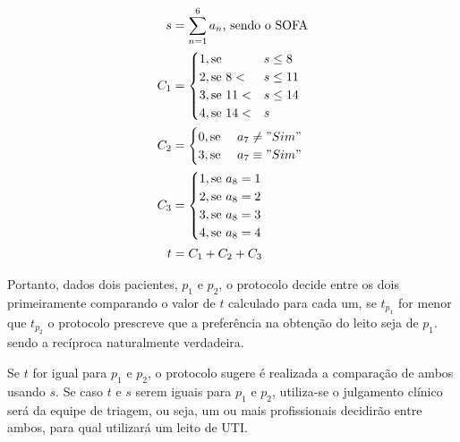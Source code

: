 \documentclass[12pt]{article}
\begin{document}
\[
\begin{split}
    s &= \sum_{n=1}^{6} a_n\text{, sendo o SOFA} \\
    C_1 &= \begin{cases}
        1, \text{se } & s \le 8 \\
        2, \text{se } 8 < & s \le 11 \\
        3, \text{se } 11 < & s \le  14 \\
        4, \text{se } 14 < & s \\
    \end{cases} \\
    C_2 &= \begin{cases}
        0, \text{se } & a_7 \neq "Sim" \\
        3, \text{se } & a_7 \equiv "Sim" \\
    \end{cases} \\
    C_3 &= \begin{cases}
        1, \text{se } a_8 = 1 \\
        2, \text{se } a_8 = 2 \\
        3, \text{se } a_8 = 3 \\
        4, \text{se } a_8 = 4 \\
    \end{cases} \\
    t &= C_1 + C_2 + C_3 \\
\end{split}
\] 


Portanto, dados dois pacientes, $p_1$ e $p_2$, o protocolo decide entre os dois primeiramente comparando o valor de $t$ calculado para cada um, se  $t_{p_1}$ for menor que $t_{p_2}$ o protocolo prescreve que a preferência na obtenção do leito seja de $p_1.$ sendo a recíproca naturalmente verdadeira.

Se $t$ for igual para $p_1$ e $p_2$, o protocolo sugere é realizada a comparação de ambos usando $s$. Se caso $t$ e $s$ serem iguais para $p_1$ e $p_2$, utiliza-se o julgamento clínico será da equipe de triagem, ou seja, um ou mais profissionais decidirão entre ambos, para qual utilizará um leito de UTI.
\end{document}

